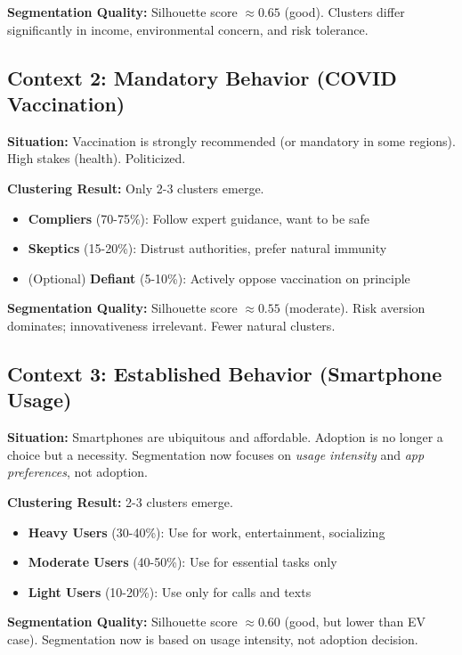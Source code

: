 \textbf{Segmentation Quality:} Silhouette score $\approx 0.65$ (good). Clusters
differ significantly in income, environmental concern, and risk tolerance.

\subsection{Context 2: Mandatory Behavior (COVID Vaccination)}

\textbf{Situation:} Vaccination is strongly recommended (or mandatory in some
regions). High stakes (health). Politicized.

\textbf{Clustering Result:} Only 2-3 clusters emerge.

\begin{itemize}[nosep]
\item \textbf{Compliers} (70-75\%): Follow expert guidance, want to be safe
\item \textbf{Skeptics} (15-20\%): Distrust authorities, prefer natural immunity
\item (Optional) \textbf{Defiant} (5-10\%): Actively oppose vaccination on principle
\end{itemize}

\textbf{Segmentation Quality:} Silhouette score $\approx 0.55$ (moderate). Risk
aversion dominates; innovativeness irrelevant. Fewer natural clusters.

\subsection{Context 3: Established Behavior (Smartphone Usage)}

\textbf{Situation:} Smartphones are ubiquitous and affordable. Adoption is no
longer a choice but a necessity. Segmentation now focuses on \textit{usage intensity}
and \textit{app preferences}, not adoption.

\textbf{Clustering Result:} 2-3 clusters emerge.

\begin{itemize}[nosep]
\item \textbf{Heavy Users} (30-40\%): Use for work, entertainment, socializing
\item \textbf{Moderate Users} (40-50\%): Use for essential tasks only
\item \textbf{Light Users} (10-20\%): Use only for calls and texts
\end{itemize}

\textbf{Segmentation Quality:} Silhouette score $\approx 0.60$ (good, but lower
than EV case). Segmentation now is based on usage intensity, not adoption
decision.

